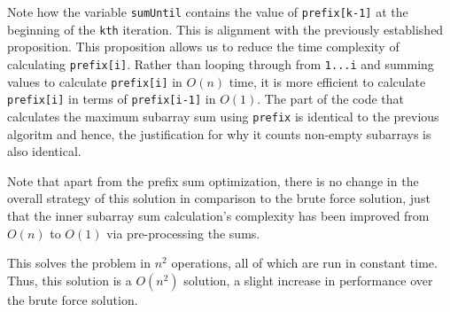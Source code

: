 \noindent Note how the variable \texttt{sumUntil} contains the value of \texttt{prefix[k-1]} at the beginning of the \texttt{kth} iteration. This is alignment with the previously established proposition. This proposition allows us to reduce the time complexity of calculating \texttt{prefix[i]}. Rather than looping through from \texttt{1...i} and summing values to calculate \texttt{prefix[i]} in $O(n)$ time, it is more efficient to calculate \texttt{prefix[i]} in terms of \texttt{prefix[i-1]} in $O(1).$ The part of the code that calculates the maximum subarray sum using \texttt{prefix} is identical to the previous algoritm and hence, the justification for why it counts non-empty subarrays is also identical. \newline

\noindent Note that apart from the prefix sum optimization, there is no change in the overall strategy of this solution in comparison to the brute force solution, just that the inner subarray sum calculation's complexity has been improved from $O(n)$ to $O(1)$ via pre-processing the sums. \newline

\noindent This solves the problem in $n^2$ operations, all of which are run in constant time. Thus, this solution is a $O(n^2)$ solution, a slight increase in performance over the brute force solution.

